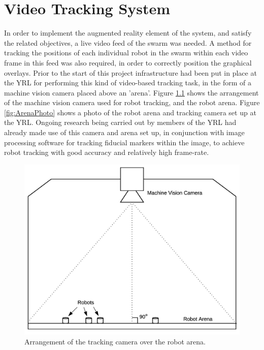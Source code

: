 
\chapter[Video Tracking System]{Video Tracking System} %

\label{Chapter6} %


In order to implement the augmented reality element of the system, and satisfy the related objectives, a live video feed of the swarm was needed. A method for tracking the positions of each individual robot in the swarm within each video frame in this feed was also required, in order to correctly position the graphical overlays. Prior to the start of this project infrastructure had been put in place at the YRL for performing this kind of video-based tracking task, in the form of a machine vision camera placed above an 'arena'. Figure \ref{fig:CameraLayout} shows the arrangement of the machine vision camera used for robot tracking, and the robot arena. Figure \ref{fig:ArenaPhoto} shows a photo of the robot arena and tracking camera set up at the YRL. Ongoing research being carried out by members of the YRL had already made use of this camera and arena set up, in conjunction with image processing software for tracking fiducial markers within the image, to achieve robot tracking with good accuracy and relatively high frame-rate.

\begin{figure}[h]
	\centering
	\includegraphics[scale=0.3]{Figures/CameraLayout.png}
	\decoRule
	\caption[Tracking Camera Arrangement]{Arrangement of the tracking camera over the robot arena.}
	\label{fig:CameraLayout}
\end{figure}

